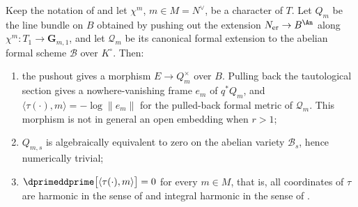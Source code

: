 \begin{proposition}
\label{prop:ch19-tau-coordinates}
Keep the notation of  and let
$\chi^{m}$, $m\in M=N^\vee$, be a character of $T$.  Let $Q_m$ be the
line bundle on $B$ obtained by pushing out the extension
$N_{\mathrm{er}}\to B^{\An}$ along $\chi^m:T_1\to\mathbf G_{m,1}$, and
let $\mathcal Q_m$ be its canonical formal extension to the abelian formal
scheme $\mathcal B$ over $K^\circ$.  Then:
\begin{enumerate}
\item\label{itm:ch19-tau:torsor} the pushout gives a morphism
 $E\to Q_m^\times$ over $B$.  Pulling back the tautological section gives
 a nowhere-vanishing frame $e_m$ of $q^*Q_m$, and
 $\langle\tau(\cdot),m\rangle=-\log\|e_m\|$ for the pulled-back formal
 metric of $\mathcal Q_m$.  This morphism is not in general an open
 embedding when $r>1$;
\item\label{itm:ch19-tau:numtriv} $Q_{m,s}$ is algebraically equivalent to
 zero on the abelian variety $\mathcal B_s$, hence numerically trivial;
\item\label{itm:ch19-tau:harmonic}
 $\dprimeddprime\bigl[\langle\tau(\cdot),m\rangle\bigr]=0$ for every
 $m\in M$, that is, all coordinates of $\tau$ are harmonic in the sense
 of  and integral harmonic in the sense of
 .
\end{enumerate}
\end{proposition}

